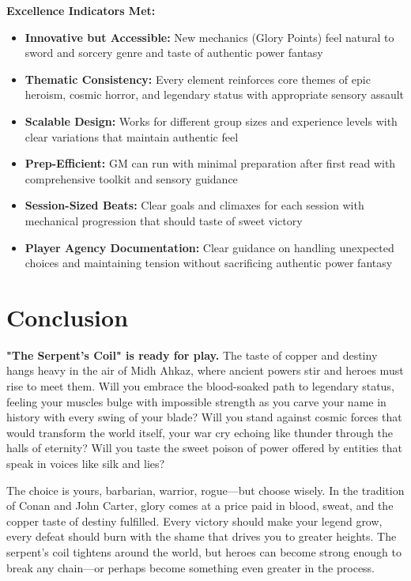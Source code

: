\documentclass[11pt]{article}
\newcommand{\cmark}{\ding{51}}%
\begin{document}
\begin{itemize}
\textbf{Excellence Indicators Met:}
\begin{itemize}
\item \cmark \textbf{Innovative but Accessible:} New mechanics (Glory Points) feel natural to sword and sorcery genre and taste of authentic power fantasy
\item \cmark \textbf{Thematic Consistency:} Every element reinforces core themes of epic heroism, cosmic horror, and legendary status with appropriate sensory assault
\item \cmark \textbf{Scalable Design:} Works for different group sizes and experience levels with clear variations that maintain authentic feel
\item \cmark \textbf{Prep-Efficient:} GM can run with minimal preparation after first read with comprehensive toolkit and sensory guidance
\item \cmark \textbf{Session-Sized Beats:} Clear goals and climaxes for each session with mechanical progression that should taste of sweet victory
\item \cmark \textbf{Player Agency Documentation:} Clear guidance on handling unexpected choices and maintaining tension without sacrificing authentic power fantasy
\end{itemize}

\section*{Conclusion}

\textbf{"The Serpent's Coil" is ready for play.} The taste of copper and destiny hangs heavy in the air of Midh Ahkaz, where ancient powers stir and heroes must rise to meet them. Will you embrace the blood-soaked path to legendary status, feeling your muscles bulge with impossible strength as you carve your name in history with every swing of your blade? Will you stand against cosmic forces that would transform the world itself, your war cry echoing like thunder through the halls of eternity? Will you taste the sweet poison of power offered by entities that speak in voices like silk and lies?

The choice is yours, barbarian, warrior, rogue—but choose wisely. In the tradition of Conan and John Carter, glory comes at a price paid in blood, sweat, and the copper taste of destiny fulfilled. Every victory should make your legend grow, every defeat should burn with the shame that drives you to greater heights. The serpent's coil tightens around the world, but heroes can become strong enough to break any chain—or perhaps become something even greater in the process.


\end{itemize}
\end{document}
